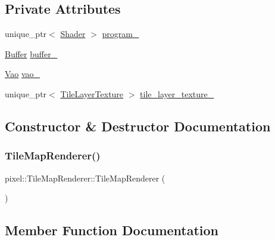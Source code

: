 \subsection*{Private Attributes}
\begin{DoxyCompactItemize}
\item 
unique\+\_\+ptr$<$ \hyperlink{classpixel_1_1graphics_1_1_shader}{Shader} $>$ \hyperlink{classpixel_1_1_tile_map_renderer_a685f60ab1349488b14198d42d1ec9ff3}{program\+\_\+}
\item 
\hyperlink{classpixel_1_1graphics_1_1_buffer}{Buffer} \hyperlink{classpixel_1_1_tile_map_renderer_a328d33f149e2ccd63f033263ac9cd22a}{buffer\+\_\+}
\item 
\hyperlink{classpixel_1_1graphics_1_1_vao}{Vao} \hyperlink{classpixel_1_1_tile_map_renderer_a017d4722cedbc963ef798beb530f2776}{vao\+\_\+}
\item 
unique\+\_\+ptr$<$ \hyperlink{classpixel_1_1_tile_layer_texture}{Tile\+Layer\+Texture} $>$ \hyperlink{classpixel_1_1_tile_map_renderer_a5a69f4f77b503ffeadffb0269050a2b1}{tile\+\_\+layer\+\_\+texture\+\_\+}
\end{DoxyCompactItemize}


\subsection{Constructor \& Destructor Documentation}
\mbox{\label{classpixel_1_1_tile_map_renderer_a4b2169226cf57b482c2ad0379af86f2a}} 
\subsubsection{\texorpdfstring{Tile\+Map\+Renderer()}{TileMapRenderer()}}
{\footnotesize\ttfamily pixel\+::\+Tile\+Map\+Renderer\+::\+Tile\+Map\+Renderer (\begin{DoxyParamCaption}{ }\end{DoxyParamCaption})}



\subsection{Member Function Documentation}
\mbox{\label{classpixel_1_1_tile_map_renderer_a3a014359e9a5030dbae6fd267eafe1e3}} 
